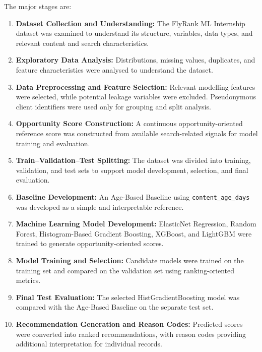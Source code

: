\documentclass[12pt,a4paper]{report}
\begin{document}
The major stages are:

\begin{enumerate}
    \item \textbf{Dataset Collection and Understanding:} The FlyRank ML Internship dataset was examined to understand its structure, variables, data types, and relevant content and search characteristics.

    \item \textbf{Exploratory Data Analysis:} Distributions, missing values, duplicates, and feature characteristics were analysed to understand the dataset.

    \item \textbf{Data Preprocessing and Feature Selection:} Relevant modelling features were selected, while potential leakage variables were excluded. Pseudonymous client identifiers were used only for grouping and split analysis.

    \item \textbf{Opportunity Score Construction:} A continuous opportunity-oriented reference score was constructed from available search-related signals for model training and evaluation.

    \item \textbf{Train--Validation--Test Splitting:} The dataset was divided into training, validation, and test sets to support model development, selection, and final evaluation.

    \item \textbf{Baseline Development:} An Age-Based Baseline using \texttt{content\_age\_days} was developed as a simple and interpretable reference.

    \item \textbf{Machine Learning Model Development:} ElasticNet Regression, Random Forest, Histogram-Based Gradient Boosting, XGBoost, and LightGBM were trained to generate opportunity-oriented scores.

    \item \textbf{Model Training and Selection:} Candidate models were trained on the training set and compared on the validation set using ranking-oriented metrics.

    \item \textbf{Final Test Evaluation:} The selected HistGradientBoosting model was compared with the Age-Based Baseline on the separate test set.

    \item \textbf{Recommendation Generation and Reason Codes:} Predicted scores were converted into ranked recommendations, with reason codes providing additional interpretation for individual records.
\end{enumerate}
\end{document}
